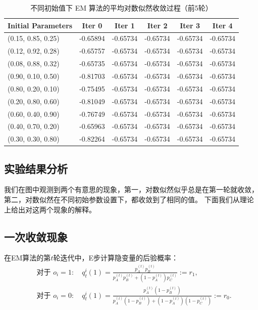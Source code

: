 \documentclass[12pt,a4paper]{article}
\begin{document}
\begin{table}[H]
\centering
\caption{不同初始值下 EM 算法的平均对数似然收敛过程（前5轮）}
\begin{tabular}{lccccc}
\toprule
\textbf{Initial Parameters} & Iter 0 & Iter 1 & Iter 2 & Iter 3 & Iter 4 \\
\midrule
(0.15, 0.85, 0.25) & -0.65894 & -0.65734 & -0.65734 & -0.65734 & -0.65734 \\
(0.12, 0.92, 0.28) & -0.65757 & -0.65734 & -0.65734 & -0.65734 & -0.65734 \\
(0.08, 0.88, 0.32) & -0.65735 & -0.65734 & -0.65734 & -0.65734 & -0.65734 \\
(0.90, 0.10, 0.50) & -0.81703 & -0.65734 & -0.65734 & -0.65734 & -0.65734 \\
(0.80, 0.20, 0.10) & -0.75495 & -0.65734 & -0.65734 & -0.65734 & -0.65734 \\
(0.20, 0.80, 0.60) & -0.81049 & -0.65734 & -0.65734 & -0.65734 & -0.65734 \\
(0.60, 0.40, 0.90) & -0.76749 & -0.65734 & -0.65734 & -0.65734 & -0.65734 \\
(0.40, 0.70, 0.20) & -0.65963 & -0.65734 & -0.65734 & -0.65734 & -0.65734 \\
(0.30, 0.30, 0.80) & -0.82264 & -0.65734 & -0.65734 & -0.65734 & -0.65734 \\
\bottomrule
\end{tabular}
\end{table}
\subsection{实验结果分析}
我们在图中观测到两个有意思的现象，第一，对数似然似乎总是在第一轮就收敛，第二，对数似然在不同初始参数设置下，都收敛到了相同的值。
下面我们从理论上给出对这两个现象的解释。
\subsection{一次收敛现象}

在EM算法的第$t$轮迭代中，E步计算隐变量的后验概率：
\begin{align}
&\text{对于 }o_i=1:\quad
q_t^i(1) = \frac{p_A^{(t)} p_B^{(t)}}{p_A^{(t)} p_B^{(t)} + (1-p_A^{(t)}) p_C^{(t)}} := r_1, \label{eq:r1} \\
&\text{对于 }o_i=0:\quad
q_t^i(1) = \frac{p_A^{(t)} (1-p_B^{(t)})}{p_A^{(t)} (1-p_B^{(t)}) + (1-p_A^{(t)}) (1-p_C^{(t)})} := r_0. \label{eq:r0}
\end{align}
\end{document}
